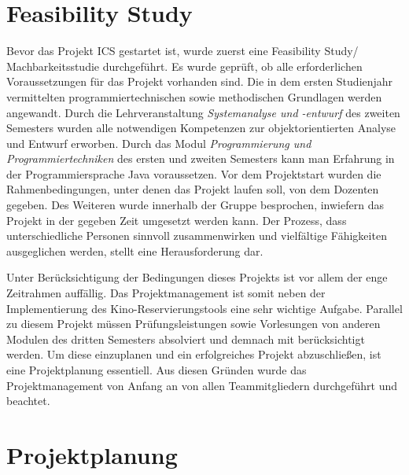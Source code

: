 	\section{Feasibility Study}
	Bevor das Projekt \ac{ICS} gestartet ist, wurde zuerst eine Feasibility Study/ Machbarkeitsstudie durchgeführt. Es wurde geprüft, ob alle erforderlichen Voraussetzungen für das Projekt vorhanden sind. Die in dem ersten Studienjahr vermittelten programmiertechnischen sowie methodischen Grundlagen werden angewandt. Durch die Lehrveranstaltung \textit{Systemanalyse und -entwurf} des zweiten Semesters wurden alle notwendigen Kompetenzen zur objektorientierten Analyse und Entwurf erworben. Durch das Modul \textit{Programmierung und Programmiertechniken} des ersten und zweiten Semesters kann man Erfahrung in der Programmiersprache Java voraussetzen. Vor dem Projektstart wurden die Rahmenbedingungen, unter denen das Projekt laufen soll, von dem Dozenten gegeben. Des Weiteren wurde innerhalb der Gruppe besprochen, inwiefern das Projekt in der gegeben Zeit umgesetzt werden kann. Der Prozess, dass unterschiedliche Personen sinnvoll zusammenwirken und vielfältige Fähigkeiten  ausgeglichen werden, stellt eine Herausforderung dar.
	
	Unter Berücksichtigung der Bedingungen dieses Projekts ist vor allem der enge Zeitrahmen auffällig. Das Projektmanagement ist somit neben der Implementierung des Kino-Reservierungstools eine sehr wichtige Aufgabe. Parallel zu diesem Projekt müssen Prüfungsleistungen sowie Vorlesungen von anderen Modulen des dritten Semesters absolviert und demnach mit berücksichtigt werden. Um diese einzuplanen und ein erfolgreiches Projekt abzuschließen, ist eine Projektplanung essentiell. Aus diesen Gründen wurde das Projektmanagement von Anfang an von allen Teammitgliedern durchgeführt und beachtet.
	
	\section{Projektplanung} \label{projektplan}
